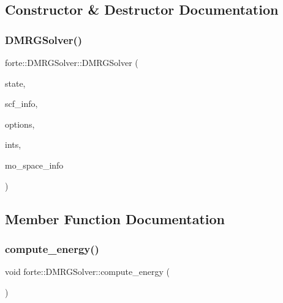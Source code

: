 \subsection{Constructor \& Destructor Documentation}
\mbox{\label{classforte_1_1_d_m_r_g_solver_a5ebba6d331bf64c143e9d04e1a8aa1ff}} 
\subsubsection{\texorpdfstring{D\+M\+R\+G\+Solver()}{DMRGSolver()}}
{\footnotesize\ttfamily forte\+::\+D\+M\+R\+G\+Solver\+::\+D\+M\+R\+G\+Solver (\begin{DoxyParamCaption}\item[{\mbox{\hyperlink{classforte_1_1_state_info}{State\+Info}}}]{state,  }\item[{std\+::shared\+\_\+ptr$<$ \mbox{\hyperlink{classforte_1_1_s_c_f_info}{S\+C\+F\+Info}} $>$}]{scf\+\_\+info,  }\item[{std\+::shared\+\_\+ptr$<$ \mbox{\hyperlink{classforte_1_1_forte_options}{Forte\+Options}} $>$}]{options,  }\item[{std\+::shared\+\_\+ptr$<$ \mbox{\hyperlink{classforte_1_1_forte_integrals}{Forte\+Integrals}} $>$}]{ints,  }\item[{std\+::shared\+\_\+ptr$<$ \mbox{\hyperlink{classforte_1_1_m_o_space_info}{M\+O\+Space\+Info}} $>$}]{mo\+\_\+space\+\_\+info }\end{DoxyParamCaption})}



\subsection{Member Function Documentation}
\mbox{\label{classforte_1_1_d_m_r_g_solver_a814330798182f4bd92f17f6dae68ff84}} 
\subsubsection{\texorpdfstring{compute\+\_\+energy()}{compute\_energy()}}
{\footnotesize\ttfamily void forte\+::\+D\+M\+R\+G\+Solver\+::compute\+\_\+energy (\begin{DoxyParamCaption}{ }\end{DoxyParamCaption})}

